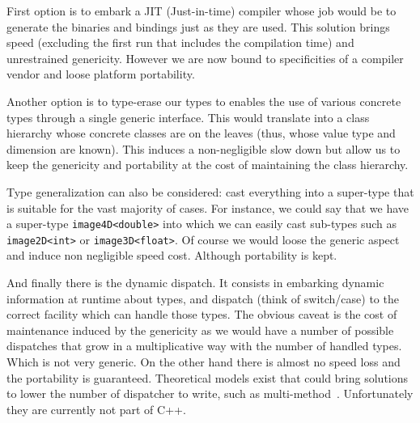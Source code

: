 First option is to embark a JIT (Just-in-time) compiler whose job would be to generate the binaries and bindings just as
they are used. This solution brings speed (excluding the first run that includes the compilation time) and unrestrained
genericity. However we are now bound to specificities of a compiler vendor and loose platform portability.

Another option is to type-erase our types to enables the use of various concrete types through a single generic
interface. This would translate into a class hierarchy whose concrete classes are on the leaves (thus, whose value type
and dimension are known). This induces a non-negligible slow down but allow us to keep the genericity and portability at
the cost of maintaining the class hierarchy.

Type generalization can also be considered: cast everything into a super-type that is suitable for the vast majority of
cases. For instance, we could say that we have a super-type \texttt{image4D<double>} into which we can easily cast
sub-types such as \texttt{image2D<int>} or \texttt{image3D<float>}. Of course we would loose the generic aspect and
induce non negligible speed cost. Although portability is kept.

And finally there is the dynamic dispatch. It consists in embarking dynamic information at runtime about types, and
dispatch (think of switch/case) to the correct facility which can handle those types. The obvious caveat is the cost of
maintenance induced by the genericity as we would have a number of possible dispatches that grow in a multiplicative way
with the number of handled types. Which is not very generic. On the other hand there is almost no speed loss and the
portability is guaranteed. Theoretical models exist that could bring solutions to lower the number of dispatcher to
write, such as multi-method~\cite{pirkelbauer.2010.multimethods}. Unfortunately they are currently not part of C++.


